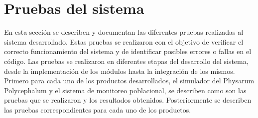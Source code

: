 \section{Pruebas del sistema}
\label{sec:Pruebas del sistema}
    En esta secci\'on se describen y documentan las diferentes pruebas realizadas al sistema desarrollado. 
        Estas pruebas se realizaron con el objetivo de verificar el correcto funcionamiento del sistema y 
        de identificar posibles errores o fallas en el c\'odigo. Las pruebas se realizaron en diferentes 
        etapas del desarrollo del sistema, desde la implementaci\'on de los m\'odulos hasta la integraci\'on 
        de los mismos. Primero para cada uno de los productos desarrollados, el simulador del Physarum
        Polycephalum y el sistema de monitoreo poblacional, se describen como son las pruebas que se realizaron
        y los resultados obtenidos. Posteriormente se describen las pruebas correspondientes para cada uno de los productos.
    
    
    
    
    
    
    
    
    
    
    
    
    
    